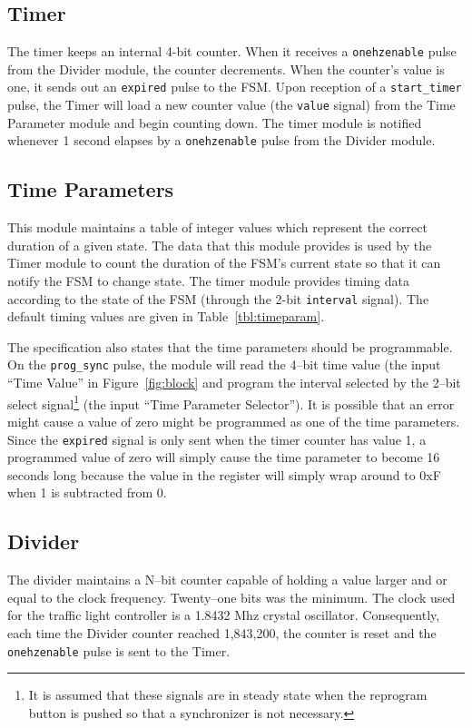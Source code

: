 \documentclass{article}
\begin{document}
	\subsection{Timer}
	The timer keeps an internal 4-bit counter.  When it receives a
	\texttt{onehzenable} pulse from the Divider module, the counter decrements.
	When the counter's value is one, it sends out an {\texttt{expired}}
	pulse to the FSM.  Upon reception of a \texttt{start\_timer}
	pulse, the Timer will load a new counter value (the \texttt{value}
	signal) from the Time Parameter module and begin counting down.  The
	timer module is notified whenever 1 second elapses by a
	\texttt{onehzenable} pulse from the Divider module.

	\subsection{Time Parameters}
	This module maintains a table of integer values which represent
	the correct duration of a given state.  The data that this module
	provides is used by the Timer module to count the duration of the FSM's
	current state so that it can notify the FSM to change state.  The timer
	module provides timing data according to the state of the FSM (through
	the 2-bit \texttt{interval} signal).  The default timing values are
	given in Table~\ref{tbl:timeparam}.

	The specification also states that the time parameters should be
	programmable.  On the \texttt{prog\_sync} pulse, the module will read
	the 4--bit time value (the input ``Time Value'' in
	Figure~\ref{fig:block} and program the interval selected by the 2--bit
	select signal\footnote{It is assumed that these signals are in steady
	state when the reprogram button is pushed so that a synchronizer is not
	necessary.} (the input ``Time Parameter Selector'').  It is possible
	that an error might cause a value of zero might be programmed as one of
	the time parameters.  Since the \texttt{expired} signal is only sent
	when the timer counter has value 1, a programmed value of zero will
	simply cause the time parameter to become 16 seconds long because the
	value in the register will simply wrap around to 0xF when 1 is
	subtracted from 0.

	\subsection{Divider}
	The divider maintains a N--bit counter capable of holding a
	value larger and or equal to the clock frequency. Twenty--one bits was the
	minimum.  The clock used for the traffic light controller is a 1.8432 Mhz
	crystal oscillator.  Consequently, each time the Divider counter reached
	1,843,200, the counter is reset and the \texttt{onehzenable} pulse is sent
	to the Timer.
\end{document}
